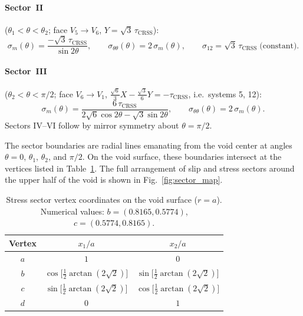 \documentclass{svjour3} %
\newcommand{\tcrss}{\tau_{\mathrm{CRSS}}}
\newcommand{\stt}{\sigma_{\theta\theta}}
\newcommand{\sm}{\sigma_m}
\begin{document}
\paragraph{Sector~II} ($\theta_1 < \theta < \theta_2$; face $V_5 \to V_6$,
$Y = \sqrt{3}\,\tcrss$):
\begin{equation}
\label{eq:sector2}
\sm(\theta) = \frac{-\sqrt{3}\,\tcrss}{\sin 2\theta}, \qquad
\stt(\theta) = 2\,\sm(\theta), \qquad
\sigma_{12} = \sqrt{3}\,\tcrss \;\text{(constant)}.
\end{equation}

\paragraph{Sector~III} ($\theta_2 < \theta < \pi/2$; face $V_6 \to V_1$,
$\frac{\sqrt{6}}{3}X - \frac{\sqrt{3}}{6}Y = -\tcrss$, i.e.\ systems 5, 12):
\begin{equation}
\label{eq:sector3}
\sm(\theta) = \frac{6\,\tcrss}
  {2\sqrt{6}\cos 2\theta - \sqrt{3}\sin 2\theta}, \qquad
\stt(\theta) = 2\,\sm(\theta).
\end{equation}
Sectors IV--VI follow by mirror symmetry about $\theta = \pi/2$.

The sector boundaries are radial lines emanating from the void center
at angles $\theta = 0$, $\theta_1$, $\theta_2$, and $\pi/2$. On the
void surface, these boundaries intersect at the vertices listed in
Table~\ref{tab:sector_vertices}. The full arrangement of slip and
stress sectors around the upper half of the void is shown in
Fig.~\ref{fig:sector_map}.

\begin{table}[htb]
\caption{Stress sector vertex coordinates on the void surface
($r = a$). Numerical values:
$b = (0.8165, 0.5774)$, $c = (0.5774, 0.8165)$.}
\label{tab:sector_vertices}
\centering
\begin{tabular}{ccc}
\toprule
Vertex & $x_1/a$ & $x_2/a$ \\
\midrule
$a$ & $1$ & $0$ \\[2pt]
$b$ & $\cos\bigl[\frac{1}{2}\arctan(2\sqrt{2})\bigr]$
    & $\sin\bigl[\frac{1}{2}\arctan(2\sqrt{2})\bigr]$ \\[2pt]
$c$ & $\sin\bigl[\frac{1}{2}\arctan(2\sqrt{2})\bigr]$
    & $\cos\bigl[\frac{1}{2}\arctan(2\sqrt{2})\bigr]$ \\[2pt]
$d$ & $0$ & $1$ \\
\bottomrule
\end{tabular}
\end{table}
\end{document}
